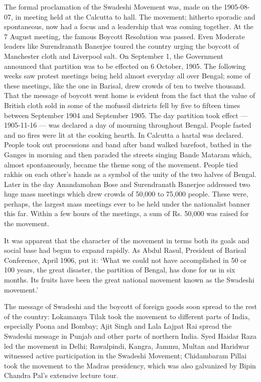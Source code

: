The formal proclamation of the Swadeshi Movement was, made on the 1905-08-07, in meeting held at the Calcutta to hall. The movement; hitherto sporadic and spontaneous, now had a focus and a leadership that was coming together. At the 7 August meeting, the famous Boycott Resolution was passed. Even Moderate leaders like Surendranath Banerjee toured the country urging the boycott of Manchester cloth and Liverpool salt. On September 1, the Government announced that partition was to be effected on 6 October, 1905. The following weeks saw protest meetings being held almost everyday all over Bengal; some of these meetings, like the one in Barisal, drew crowds of ten to twelve thousand. That the message of boycott went home is evident from the fact that the value of British cloth sold in some of the mofussil districts fell by five to fifteen times between September 1904 and September 1905. The day partition took effect --- 1905-11-16 --- was declared a day of mourning throughout Bengal. People fasted and no fires were lit at the cooking hearth. In Calcutta a hartal was declared. People took out processions and band after band walked barefoot, bathed in the Ganges in morning and then paraded the streets singing Bande Mataram which, almost spontaneously, became the theme song of the movement. People tied rakhis on each other's hands as a symbol of the unity of the two halves of Bengal. Later in the day Anandamohan Bose and Surendranath Banerjee addressed two huge mass meetings which drew crowds of 50,000 to 75,000 people. These were, perhaps, the largest mass meetings ever to be held under the nationalist banner this far. Within a few hours of the meetings, a sum of Rs. 50,000 was raised for the movement.

It was apparent that the character of the movement in terms both its goals and social base had begun to expand rapidly. As Abdul Rasul, President of Barisal Conference, April 1906, put it: `What we could not have accomplished in 50 or 100 years, the great disaster, the partition of Bengal, has done for us in six months. Its fruits have been the great national movement known as the Swadeshi movement.'

The message of Swadeshi and the boycott of foreign goods soon spread to the rest of the country: Lokamanya Tilak took the movement to different parts of India, especially Poona and Bombay; Ajit Singh and Lala Lajpat Rai spread the Swadeshi message in Punjab and other parts of northern India. Syed Haidar Raza led the movement in Delhi; Rawalpindi, Kangra, Jammu, Multan and Haridwar witnessed active participation in the Swadeshi Movement; Chidambaram Pillai took the movement to the Madras presidency, which was also galvanized by Bipin Chandra Pal's extensive lecture tour.

